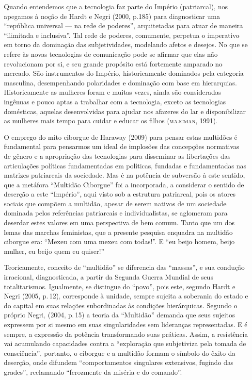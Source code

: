 Quando entendemos que a tecnologia faz parte do Império (patriarcal),
nos apegamos à noção de Hardt e Negri (2000, p.185) para diagnosticar
uma ``república universal --- na rede de poderes'', arquitetadas para
atuar de maneira ``ilimitada e inclusiva''. Tal rede de poderes,
comumente, perpetua o imperativo em torno da dominação das
subjetividades, modelando afetos e desejos. No que se refere às novas
tecnologias de comunicação pode se afirmar que elas não revolucionam por
si, e seu grande propósito está fortemente amparado no mercado. São
instrumentos do Império, historicamente dominados pela categoria
masculina, desempenhando polaridades e dominação com base em
hierarquias. Historicamente as mulheres foram e muitas vezes, ainda são
consideradas ingênuas e pouco aptas a trabalhar com a tecnologia, exceto
as tecnologias domésticas, aquelas desenvolvidas para ajudar nos
afazeres do lar e disponibilizar as mulheres mais tempo para cuidar e
educar os filhos (\textsc{wajcman}, 1991).

O emprego do mito ciborgue de Haraway (2009) para pensar estas multidões
é fundamental para pensarmos um ideal de implosões das concepções
normativas de gênero e a apropriação das tecnologias para disseminar as
libertações das articulações políticas fundamentadas em políticas,
fundadas e fundamentadas nas matrizes patriarcais da sociedade. Mas é na
potência de subversão à este sentido, que a metáfora ``Multidão
Ciborgue'' foi a incorporada, a considerar o sentido de deserção a este
``Império'', aqui visto sob a estrutura patriarcal, pois os atores
sociais que compõem a multidão, apesar de serem nativos de um sociedade
dominada pelos referências patriarcais e individualistas, se aglomeram
para deserdar estes valores em uma perspectiva de bem comum. Tanto que
um dos lemas das marchas feministas, que a presente pesquisa enquadra na
multidão ciborgue era: ``Mexeu com uma mexeu com todas!''. E ``eu beijo
homem, beijo mulher, eu beijo quem eu quiser!''

Teoricamente, conceito de ``multidão'' se diferencia das ``massas'', e
sua condução irracional, diagnosticada, a partir da Segunda Guerra
Mundial de seus totalitarismos. Igualmente, se distingue do ``povo'',
pois este, segundo Hardt e Negri (2005, p.\,12), corresponde à unidade,
sempre sujeita a soberania do estado e do capital em suas relações
subordinadas às condições hierárquicas. Segundo o próprio Negri, (2004,
p.\,15) a teoria da ``Multidão'' demanda que seus sujeitos expressem por
si mesmo em suas singularidades sem lideranças representadas. E é
sempre, a expressão da potência transformando suas práticas. Assim, a
resistência vai acumulando capacidades contra a ``exploração que
subjetiviza pela tomada de consciência'', portanto, o ciborgue e a
multidão formam o símbolo do êxito da deserção, onde difundem
``comportamentos singulares extensivos, fugindo das grades'', reclamando
``ferozmente da miséria e do comando''.

